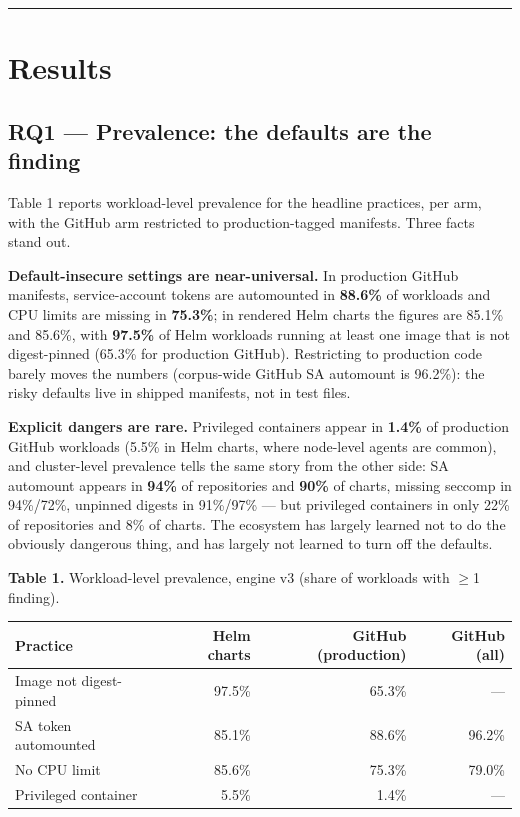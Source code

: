 \documentclass[pdflatex,sn-basic]{sn-jnl}
\begin{document}
\begin{center}\rule{0.5\linewidth}{0.5pt}\end{center}

\hypertarget{results}{%
\section{Results}\label{results}}

\hypertarget{rq1-prevalence-the-defaults-are-the-finding}{%
\subsection{RQ1 --- Prevalence: the defaults are the
finding}\label{rq1-prevalence-the-defaults-are-the-finding}}

Table 1 reports workload-level prevalence for the headline practices,
per arm, with the GitHub arm restricted to production-tagged manifests.
Three facts stand out.

\textbf{Default-insecure settings are near-universal.} In production
GitHub manifests, service-account tokens are automounted in
\textbf{88.6\%} of workloads and CPU limits are missing in
\textbf{75.3\%}; in rendered Helm charts the figures are 85.1\% and
85.6\%, with \textbf{97.5\%} of Helm workloads running at least one
image that is not digest-pinned (65.3\% for production GitHub).
Restricting to production code barely moves the numbers (corpus-wide
GitHub SA automount is 96.2\%): the risky defaults live in shipped
manifests, not in test files.

\textbf{Explicit dangers are rare.} Privileged containers appear in
\textbf{1.4\%} of production GitHub workloads (5.5\% in Helm charts,
where node-level agents are common), and cluster-level prevalence tells
the same story from the other side: SA automount appears in
\textbf{94\%} of repositories and \textbf{90\%} of charts, missing
seccomp in 94\%/72\%, unpinned digests in 91\%/97\% --- but privileged
containers in only 22\% of repositories and 8\% of charts. The ecosystem
has largely learned not to do the obviously dangerous thing, and has
largely not learned to turn off the defaults.

\textbf{Table 1.} Workload-level prevalence, engine v3 (share of
workloads with $\geq$1 finding).

\begin{longtable}[]{@{}lrrr@{}}
\toprule\noalign{}
Practice & Helm charts & GitHub (production) & GitHub (all) \\
\midrule\noalign{}
\endhead
\bottomrule\noalign{}
\endlastfoot
Image not digest-pinned & 97.5\% & 65.3\% & --- \\
SA token automounted & 85.1\% & 88.6\% & 96.2\% \\
No CPU limit & 85.6\% & 75.3\% & 79.0\% \\
Privileged container & 5.5\% & 1.4\% & --- \\
\end{longtable}
\end{document}
